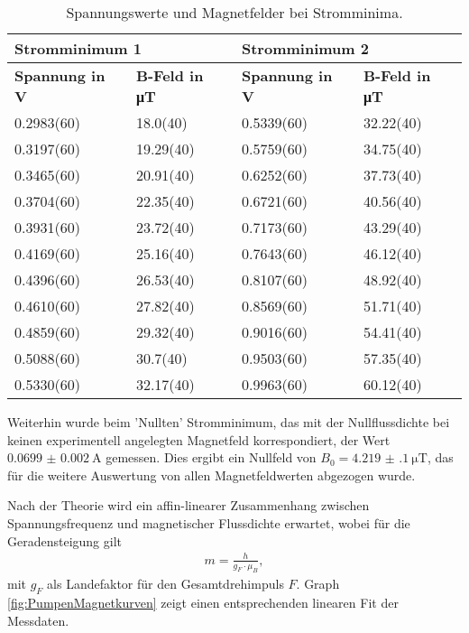 \documentclass[../main.tex]{subfiles}
\begin{document}
    \begin{table}[H]
        \centering
        \begin{tabular}{l|l|l|l}
            \multicolumn{2}{l|}{\textbf{Stromminimum 1}} & \multicolumn{2}{l}{\textbf{Stromminimum 2}}\\
            \hline
            \textbf{Spannung in V} & \textbf{B-Feld in \si{\micro\tesla}} & \textbf{Spannung in V} & \textbf{B-Feld in \si{\micro\tesla}}\\
            \hline\hline
            0.2983(60) & 18.0(40) & 0.5339(60) & 32.22(40)\\
            \hline
            0.3197(60) & 19.29(40) & 0.5759(60) & 34.75(40)\\
            \hline
            0.3465(60) & 20.91(40) & 0.6252(60) & 37.73(40)\\
            \hline
            0.3704(60) & 22.35(40) & 0.6721(60) & 40.56(40)\\
            \hline
            0.3931(60) & 23.72(40) & 0.7173(60) & 43.29(40)\\
            \hline
            0.4169(60) & 25.16(40) & 0.7643(60) & 46.12(40)\\
            \hline
            0.4396(60) & 26.53(40) & 0.8107(60) & 48.92(40)\\
            \hline
            0.4610(60) & 27.82(40) & 0.8569(60) & 51.71(40)\\
            \hline
            0.4859(60) & 29.32(40) & 0.9016(60) & 54.41(40)\\
            \hline
            0.5088(60) & 30.7(40) & 0.9503(60) & 57.35(40)\\
            \hline
            0.5330(60) & 32.17(40) & 0.9963(60) & 60.12(40)
        \end{tabular}
        \caption{Spannungswerte und Magnetfelder bei Stromminima.}
        \label{tab:PumpenMessdaten}
    \end{table}

    Weiterhin wurde beim 'Nullten' Stromminimum, das mit der Nullflussdichte bei keinen experimentell angelegten Magnetfeld korrespondiert, der Wert $\SI{0.0699(20)}{\ampere}$ gemessen. Dies ergibt ein Nullfeld von $B_0=\SI{ 4.219(100)}{\micro\tesla}$, das für die weitere Auswertung von allen Magnetfeldwerten abgezogen wurde.

    Nach der Theorie wird ein affin-linearer Zusammenhang zwischen Spannungsfrequenz und magnetischer Flussdichte erwartet, wobei für die Geradensteigung gilt 
    \begin{align*}
        m = \frac{h}{g_F\cdot\mu_B},        
    \end{align*}
    mit $g_F$ als Landefaktor für den Gesamtdrehimpuls $F$. Graph \ref{fig:PumpenMagnetkurven} zeigt einen entsprechenden linearen Fit der Messdaten.
    
\end{document}
